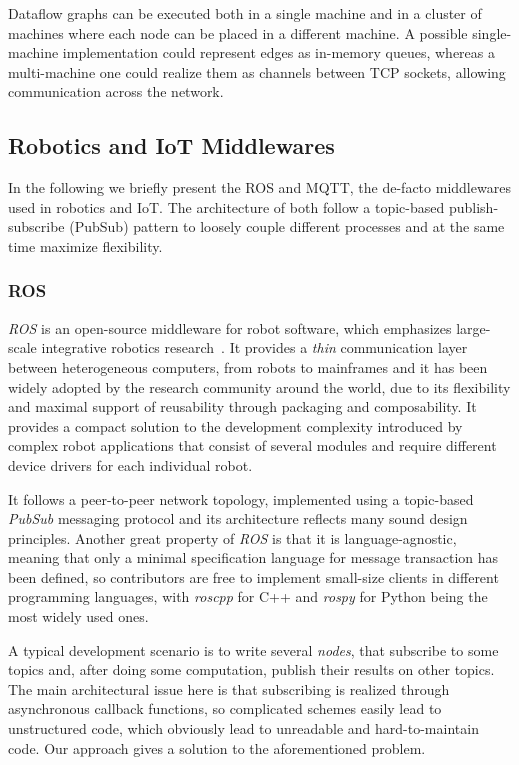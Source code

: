 \documentclass[sigplan,screen,10pt]{acmart}
\begin{document}
Dataflow graphs can be executed both in a single machine and in a cluster of
machines where each node can be placed in a different machine. A possible
single-machine implementation could represent edges as in-memory queues,
whereas a multi-machine one could realize them as channels between TCP sockets,
allowing communication across the network.

\subsection{Robotics and IoT Middlewares}
In the following we briefly present the ROS and MQTT, the de-facto middlewares
used in robotics and IoT. The architecture of both follow a topic-based
publish-subscribe (PubSub) pattern to loosely couple different processes and
at the same time maximize flexibility.

\subsubsection{ROS}
\textit{ROS} is an open-source middleware for robot software, which emphasizes
large-scale integrative robotics research~\cite{ROS}. It provides a \textit{thin}
communication layer between heterogeneous computers, from robots to mainframes
and it has been widely adopted by the research community around the world, due
to its flexibility and maximal support of reusability through packaging and
composability. It provides a compact solution to the development complexity
introduced by complex robot applications that consist of several modules and
require different device drivers for each individual robot.

It follows a peer-to-peer network topology, implemented using a topic-based
\textit{PubSub} messaging protocol and its architecture reflects many sound
design principles. Another great property of \textit{ROS} is that it is
language-agnostic, meaning that only a minimal specification language for
message transaction has been defined, so contributors are free to implement
small-size clients in different programming languages, with \textit{roscpp} for C++
and \textit{rospy} for Python being the most widely used ones.

A typical development scenario is to write several \textit{nodes}, that
subscribe to some topics and, after doing some computation, publish their
results on other topics. The main architectural issue here is that subscribing
is realized through asynchronous callback functions, so complicated schemes
easily lead to unstructured code, which obviously lead to unreadable and
hard-to-maintain code. Our approach gives a solution to the aforementioned
problem.
\end{document}
